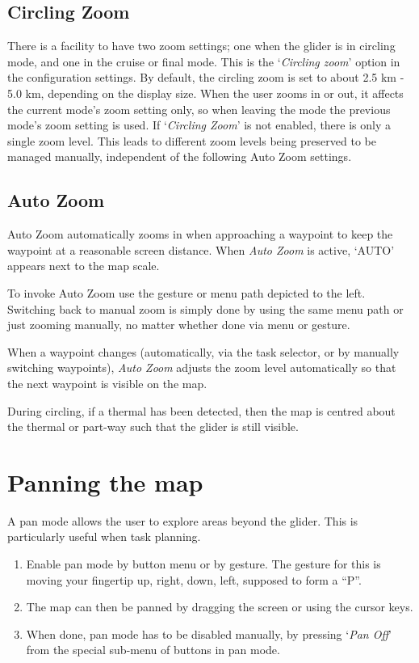 \subsection*{Circling Zoom}
There is a facility to have two zoom settings; one when the glider is
in circling mode, and one in the cruise or final mode.  This is the `\emph{Circling zoom}' 
option in the  configuration settings.  
By default, the circling zoom is set to about 2.5 km - 5.0 km, depending on the
display size. When the user zooms in or out, it affects the current
mode's zoom setting only, so when leaving the mode the previous mode's
zoom setting is used.  If `\emph{Circling Zoom}' is not enabled,
there is only a single zoom level.
This leads to different zoom levels being preserved to be managed manually, 
independent of the following Auto Zoom settings.

\subsection*{Auto Zoom}
Auto Zoom automatically zooms in when approaching a waypoint to keep
the waypoint at a reasonable screen distance. When \emph{Auto Zoom} is active,
`AUTO' appears next to the map scale.

To invoke Auto Zoom use the gesture 
or menu path depicted to the left. 
Switching back to manual zoom is simply done by using the same menu path
or just zooming manually, no matter whether done via menu or gesture.

When a waypoint changes (automatically, via the task selector, or by
manually switching waypoints), \emph{Auto Zoom} adjusts the zoom level
automatically so that the next waypoint is visible on the map.

During circling, if a thermal has been detected, then the map is centred about
the thermal or part-way such that the glider is still visible.

\section{Panning the map}\label{sec:panning}

A pan mode allows the user to explore areas beyond the glider.  This
is particularly useful when task planning.
\begin{enumerate}
\item Enable pan mode by button menu or by gesture.  The gesture for this is moving your fingertip up, right, down, left, supposed to form a ``P''.
\item The map can then be panned by dragging the screen or using the cursor
  keys.
\item When done, pan mode has to be disabled manually, by pressing `\emph{Pan Off}' 
  from the special sub-menu of buttons in pan mode.
\end{enumerate} 

